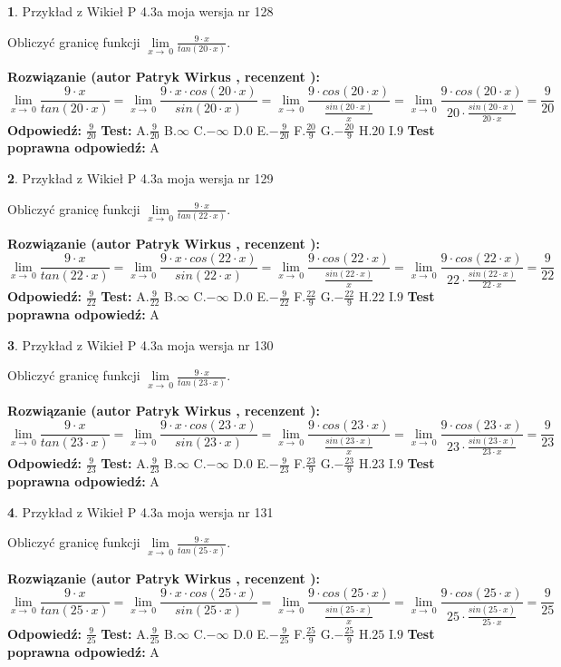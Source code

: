 \documentclass[12pt, a4paper]{article}
\theoremstyle{definition} %
\newtheorem{zad}{}
\newcommand{\zadStart}[1]{\begin{zad}#1\newline}
\newcommand{\zadStop}{\end{zad}}
\newcommand{\rozwStart}[2]{\noindent \textbf{Rozwiązanie (autor #1 , recenzent #2): }\newline}
\newcommand{\rozwStop}{\newline}
\newcommand{\odpStart}{\noindent \textbf{Odpowiedź:}\newline}
\newcommand{\odpStop}{\newline}
\newcommand{\testStart}{\noindent \textbf{Test:}\newline}
\newcommand{\testStop}{\newline}
\newcommand{\kluczStart}{\noindent \textbf{Test poprawna odpowiedź:}\newline}
\newcommand{\kluczStop}{\newline}
\begin{document}
\zadStart{Przykład z Wikieł P 4.3a moja wersja nr 128}


Obliczyć granicę funkcji $\lim\limits_{x\to\ 0}\frac{9 \cdot x}{tan(20 \cdot x)}$.
\zadStop
\rozwStart{Patryk Wirkus}{}
$$\lim\limits_{x\to\ 0}\frac{9 \cdot x}{tan(20 \cdot x)}=\lim\limits_{x\to\ 0}\frac{9 \cdot x \cdot cos(20 \cdot x)}{sin(20 \cdot x)}=\lim\limits_{x\to\ 0}\frac{9 \cdot cos(20 \cdot x)}{\frac{sin(20 \cdot x)}{x}}=\lim\limits_{x\to\ 0}\frac{9 \cdot cos(20 \cdot x)}{20 \cdot \frac{sin(20 \cdot x)}{20 \cdot x}} = \frac{9}{20}$$
\rozwStop
\odpStart
$\frac{9}{20}$
\odpStop
\testStart
A.$\frac{9}{20}$
B.$\infty$
C.$-\infty$
D.$0$
E.$-\frac{9}{20}$
F.$\frac{20}{9}$
G.$-\frac{20}{9}$
H.$20$
I.$9$
\testStop
\kluczStart
A
\kluczStop



\zadStart{Przykład z Wikieł P 4.3a moja wersja nr 129}


Obliczyć granicę funkcji $\lim\limits_{x\to\ 0}\frac{9 \cdot x}{tan(22 \cdot x)}$.
\zadStop
\rozwStart{Patryk Wirkus}{}
$$\lim\limits_{x\to\ 0}\frac{9 \cdot x}{tan(22 \cdot x)}=\lim\limits_{x\to\ 0}\frac{9 \cdot x \cdot cos(22 \cdot x)}{sin(22 \cdot x)}=\lim\limits_{x\to\ 0}\frac{9 \cdot cos(22 \cdot x)}{\frac{sin(22 \cdot x)}{x}}=\lim\limits_{x\to\ 0}\frac{9 \cdot cos(22 \cdot x)}{22 \cdot \frac{sin(22 \cdot x)}{22 \cdot x}} = \frac{9}{22}$$
\rozwStop
\odpStart
$\frac{9}{22}$
\odpStop
\testStart
A.$\frac{9}{22}$
B.$\infty$
C.$-\infty$
D.$0$
E.$-\frac{9}{22}$
F.$\frac{22}{9}$
G.$-\frac{22}{9}$
H.$22$
I.$9$
\testStop
\kluczStart
A
\kluczStop



\zadStart{Przykład z Wikieł P 4.3a moja wersja nr 130}


Obliczyć granicę funkcji $\lim\limits_{x\to\ 0}\frac{9 \cdot x}{tan(23 \cdot x)}$.
\zadStop
\rozwStart{Patryk Wirkus}{}
$$\lim\limits_{x\to\ 0}\frac{9 \cdot x}{tan(23 \cdot x)}=\lim\limits_{x\to\ 0}\frac{9 \cdot x \cdot cos(23 \cdot x)}{sin(23 \cdot x)}=\lim\limits_{x\to\ 0}\frac{9 \cdot cos(23 \cdot x)}{\frac{sin(23 \cdot x)}{x}}=\lim\limits_{x\to\ 0}\frac{9 \cdot cos(23 \cdot x)}{23 \cdot \frac{sin(23 \cdot x)}{23 \cdot x}} = \frac{9}{23}$$
\rozwStop
\odpStart
$\frac{9}{23}$
\odpStop
\testStart
A.$\frac{9}{23}$
B.$\infty$
C.$-\infty$
D.$0$
E.$-\frac{9}{23}$
F.$\frac{23}{9}$
G.$-\frac{23}{9}$
H.$23$
I.$9$
\testStop
\kluczStart
A
\kluczStop



\zadStart{Przykład z Wikieł P 4.3a moja wersja nr 131}


Obliczyć granicę funkcji $\lim\limits_{x\to\ 0}\frac{9 \cdot x}{tan(25 \cdot x)}$.
\zadStop
\rozwStart{Patryk Wirkus}{}
$$\lim\limits_{x\to\ 0}\frac{9 \cdot x}{tan(25 \cdot x)}=\lim\limits_{x\to\ 0}\frac{9 \cdot x \cdot cos(25 \cdot x)}{sin(25 \cdot x)}=\lim\limits_{x\to\ 0}\frac{9 \cdot cos(25 \cdot x)}{\frac{sin(25 \cdot x)}{x}}=\lim\limits_{x\to\ 0}\frac{9 \cdot cos(25 \cdot x)}{25 \cdot \frac{sin(25 \cdot x)}{25 \cdot x}} = \frac{9}{25}$$
\rozwStop
\odpStart
$\frac{9}{25}$
\odpStop
\testStart
A.$\frac{9}{25}$
B.$\infty$
C.$-\infty$
D.$0$
E.$-\frac{9}{25}$
F.$\frac{25}{9}$
G.$-\frac{25}{9}$
H.$25$
I.$9$
\testStop
\kluczStart
A
\kluczStop
\end{document}

